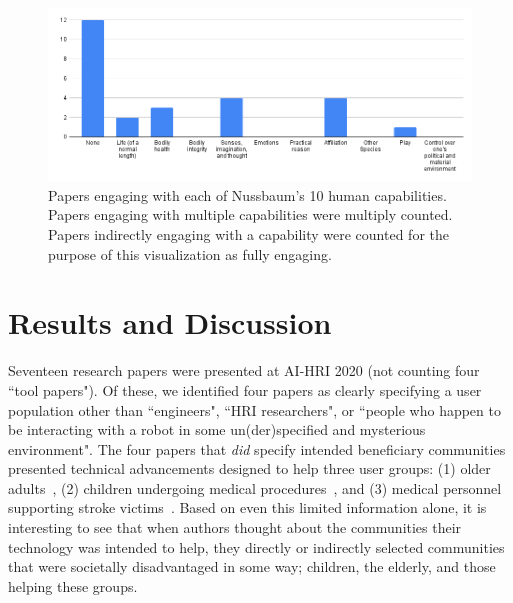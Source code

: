 \documentclass[letterpaper]{article} %
\begin{document}
\begin{figure}[!ht]
    \centering
    \includegraphics[width=\linewidth]{chart}
    \caption{Papers engaging with each of Nussbaum's 10 human capabilities. Papers engaging with multiple capabilities were multiply counted. Papers indirectly engaging with a capability were counted for the purpose of this visualization as fully engaging.}
    \label{fig:chart}
\end{figure}

\section{Results and Discussion}
Seventeen research papers were presented at AI-HRI 2020 (not counting four ``tool papers"). Of these, we identified four papers as clearly specifying a user population other than ``engineers", ``HRI researchers", or ``people who happen to be interacting with a robot in some un(der)specified and mysterious environment". The four papers that \textit{did} specify intended beneficiary communities presented technical advancements designed to help three user groups: (1) older adults~\cite{reneau2020supporting,wilson2020knowledge}, (2) children undergoing medical procedures~\cite{foster2020towards}, and (3) medical personnel supporting stroke victims~\cite{pourebadi2020stroke}. Based on even this limited information alone, it is interesting to see that when authors  thought about the communities their technology was intended to help, they directly or indirectly selected communities that were societally disadvantaged in some way; children, the elderly, and those helping these groups.
\end{document}
